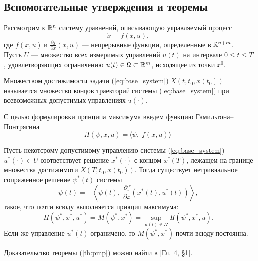 \subsection{Вспомогательные утверждения и теоремы}

Рассмотрим в $\mathbb{R}^n$ систему уравнений, описывающую управляемый процесс
\begin{equation} \label{eq:base_system}
\dot x = f(x, u),
\end{equation}
где $f(x, u)$ и $\frac{\partial f}{\partial x}(x, u)$ --- непрерывные функции, определенные в $\mathbb{R}^{n+m}$. Пусть $U$ --- множество всех измеримых управлений $u(t)$ на интервале $0 \leqslant t \leqslant T$, удовлетворяющих ограничению $u(t) \in \Omega \subset \mathbb{R}^m$, исходящее из точки $x^0$.

\theoremstyle{definition}
\begin{definition}
        Множеством достижимости задачи (\ref{eq:base_system}) $X(t, t_0, x(t_0))$ называется множество концов траекторий системы (\ref{eq:base_system}) при всевозможных допустимых управлениях $u(\cdot)$.
\end{definition}
С целью формулировки принципа максимума введем функцию Гамильтона--Понтрягина
$$
        H(\psi, x, u) = \langle \psi,\; f(x, u) \rangle.
$$

\begin{theorem} \label{th:pmp}
        Пусть некоторому допустимому управлению системы (\ref{eq:base_system}) $u^*(\cdot) \in U$ соответствует решение $x^*(\cdot)$ с концом $x^*(T)$, лежащем на границе множества достижимоти $X(T, t_0, x(t_0))$. Тогда существует нетривиальное сопряженное решение $\psi^*(t)$ системы
        $$
                \dot \psi(t) = -\left\langle \psi(t),\;\frac{\partial f}{\partial x} (x^*(t), u^*(t))\right\rangle,
        $$
        такое, что почти всюду выполняется принцип максимума:
        $$
                H(\psi^*, x^*, u^*) = M(\psi^*, x^*) = \sup\limits_{u(t) \in \Omega} H(\psi^*, x^*, u).
        $$
        Если же управление $u^*(t)$ ограничено, то $M(\psi^*, x^*)$ почти всюду постоянна.
\end{theorem}

Доказательство теоремы (\ref{th:pmp}) можно найти в \cite{li72}[Гл.~4, \S1].
